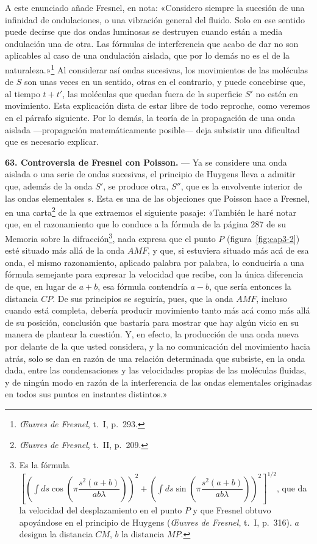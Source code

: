 A este enunciado añade Fresnel, en nota: «Considero siempre la
sucesión de una infinidad de ondulaciones, o una vibración general del
fluido. Solo en ese sentido puede decirse que dos ondas luminosas se
destruyen cuando están a media ondulación una de otra. Las fórmulas de
interferencia que acabo de dar no son aplicables al caso de una ondulación
aislada, que por lo demás no es el de la naturaleza.»\footnote{\emph{Œuvres
de Fresnel}, t.~I, p.~293.} Al considerar así ondas sucesivas, los
movimientos de las moléculas de $S$ son unas veces en un sentido, otras en
el contrario, y puede concebirse que, al tiempo $t+t'$, las moléculas que
quedan fuera de la superficie $S'$ no estén en movimiento. Esta explicación
dista de estar libre de todo reproche, como veremos en el párrafo
siguiente. Por lo demás, la teoría de la propagación de una onda aislada
—propagación matemáticamente posible— deja subsistir una dificultad que es
necesario explicar.

\noindent\textbf{63. Controversia de Fresnel con Poisson.} — Ya se
considere una onda aislada o una serie de ondas sucesivas, el principio de
Huygens lleva a admitir que, además de la onda $S'$, se produce otra, $S''$,
que es la envolvente interior de las ondas elementales $s$. Esta es una de
las objeciones que Poisson hace a Fresnel, en una carta\footnote{\emph{Œuvres
de Fresnel}, t.~II, p.~209.} de la que extraemos el siguiente pasaje:
«También le haré notar que, en el razonamiento que lo conduce a la fórmula
de la página 287 de su Memoria sobre la difracción\footnote{Es la fórmula
$\left[\left(\int ds\cos\!\left(\pi\dfrac{s^2(a+b)}{ab\lambda}\right)\right)^2
+\left(\int ds\sin\!\left(\pi\dfrac{s^2(a+b)}{ab\lambda}\right)\right)^2\right]^{1/2}$,
que da la velocidad del desplazamiento en el punto $P$ y que Fresnel obtuvo
apoyándose en el principio de Huygens (\emph{Œuvres de Fresnel}, t.~I,
p.~316). $a$ designa la distancia $CM$, $b$ la distancia $MP$.}, nada
expresa que el punto $P$ (figura~\ref{fig:cap3-2}) esté situado más allá de
la onda $AMF$, y que, si estuviera situado más acá de esa onda, el mismo
razonamiento, aplicado palabra por palabra, lo conduciría a una fórmula
semejante para expresar la velocidad que recibe, con la única diferencia de
que, en lugar de $a+b$, esa fórmula contendría $a-b$, que sería entonces la
distancia $CP$. De sus principios se seguiría, pues, que la onda $AMF$,
incluso cuando está completa, debería producir movimiento tanto más acá como
más allá de su posición, conclusión que bastaría para mostrar que hay algún
vicio en su manera de plantear la cuestión. Y, en efecto, la producción de
una onda nueva por delante de la que usted considera, y la no comunicación
del movimiento hacia atrás, solo se dan en razón de una relación
determinada que subsiste, en la onda dada, entre las condensaciones y las
velocidades propias de las moléculas fluidas, y de ningún modo en razón de
la interferencia de las ondas elementales originadas en todos sus puntos en
instantes distintos.»


